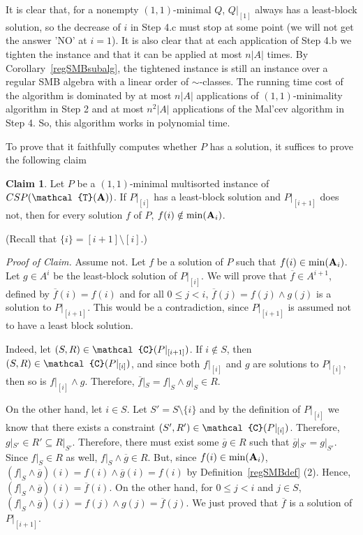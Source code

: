 \documentclass[11pt]{amsart}
\newcommand{\m}[1]{{\uppercase {\mathbf {#1}}}}
\newcommand{\vr}[1]{{\uppercase {\mathcal{#1}}}}
\newcommand{\mt}{\wedge}
\theoremstyle{definition}
\newtheorem{claim}[thm]{\sc Claim}
\begin{document}
It is clear that, for a nonempty $(1,1)$-minimal $Q$, $Q|_{[1]}$ always has a least-block solution, so the decrease of $i$ in Step 4.c must stop at some point (we will not get the answer 'NO' at $i=1$). It is also clear that at each application of Step 4.b we tighten the instance and that it can be applied at most $n|A|$ times. By Corollary~\ref{regSMBsubalg}, the tightened instance is still an instance over a regular SMB algebra with a linear order of $\sim$-classes. The running time cost of the algorithm is dominated by at most $n|A|$ applications of $(1,1)$-minimality algorithm in Step 2 and at most $n^2|A|$ applications of the Mal'cev algorithm in Step 4. So, this algorithm works in polynomial time.

To prove that it faithfully computes whether $P$ has a solution, it suffices to prove the following claim

\begin{claim}
Let $P$ be a $(1,1)$-minimal multisorted instance of $CSP(\vr t(\m a))$. If $P|_{[i]}$ has a least-block solution and $P|_{[i+1]}$ does not, then for every solution $f$ of $P$, $f(i)\notin\mathrm{min}(\m A_{i})$.
\end{claim}

(Recall that $\{i\}=[i+1]\setminus[i]$.)

{\em Proof of Claim.} Assume not. Let $f$ be a solution of $P$ such that $f(i)\in\mathrm{min}(\m A_{i})$. Let $g\in A^i$ be the least-block solution of $P|_{[i]}$. We will prove that $\overline{f}\in A^{i+1}$, defined by $\overline{f}(i)=f(i)$ and for all $0\leq j<i$, $\overline{f}(j)=f(j)\mt g(j)$ is a solution to $P|_{[i+1]}$. This would be a contradiction, since $P|_{[i+1]}$ is assumed not to have a least block solution.

Indeed, let $(S,R)\in\vr c(P|_{[i+1]})$. If $i\notin S$, then $(S,R)\in\vr c(P|_{[i]})$, and since both $f|_{[i]}$ and $g$ are solutions to $P|_{[i]}$, then so is $f|_{[i]}\mt g$. Therefore, $\overline{f}|_S=f|_S\mt g|_S\in R$.

On the other hand, let $i\in S$. Let $S'=S\setminus\{i\}$ and by the definition of $P|_{[i]}$ we know that there exists a constraint $(S',R')\in\vr c(P|_{[i]})$. Therefore, $g|_{S'}\in R'\subseteq R|_{S'}$. Therefore, there must exist some $\overline{g}\in R$ such that $\overline{g}|_{S'}=g|_{S'}$. Since $f|_{S}\in R$ as well, $f|_{S}\mt \overline{g}\in R$. But, since $f(i)\in\mathrm{min}(\m A_i)$, $(f|_{S}\mt \overline{g})(i)=f(i)\mt\overline{g}(i) =f(i)$ by Definition~\ref{regSMBdef} (2). Hence, $(f|_{S}\mt \overline{g})(i)=\overline{f}(i)$. On the other hand, for $0\leq j<i$ and $j\in S$, $(f|_{S}\mt \overline{g})(j)=f(j)\mt g(j)=\overline{f}(j)$. We just proved that $\overline{f}$ is a solution of $P|_{[i+1]}$.
\end{document}
